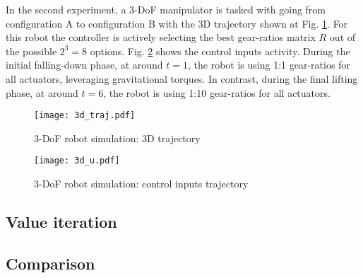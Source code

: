 In the second experiment, a 3-DoF manipulator is tasked with going from configuration A to configuration B with the 3D trajectory shown at Fig. \ref{fig:3d_traj}. For this robot the controller is actively selecting the best gear-ratios matrix $R$ out of the possible $2^3=8$ options. Fig. \ref{fig:3d_u} shows the control inputs activity. During the initial falling-down phase, at around $t=1$, the robot is using 1:1 gear-ratios for all actuators, leveraging gravitational torques. In contrast, during the final lifting phase, at around $t=6$, the robot is using 1:10 gear-ratios for all actuators. 
%
%
%
\begin{figure}[htp]
	\centering
		\texttt{[image: 3d\_traj.pdf]}
	\caption{ 3-DoF robot simulation: 3D trajectory }
	\label{fig:3d_traj}
\end{figure}
%
%
\begin{figure}[htp]
	\centering
		\texttt{[image: 3d\_u.pdf]}
	\caption{ 3-DoF robot simulation: control inputs trajectory}
	\label{fig:3d_u}
\end{figure}
%




\subsection{Value iteration}




\subsection{Comparison}


